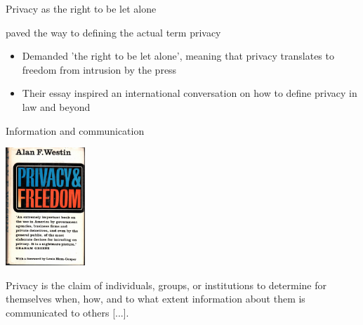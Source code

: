 \documentclass[12pt,aspectratio=169,handout]{beamer}
\begin{document}
\begin{frame}{Privacy as the right to be let alone}


\citet{Warren.Brandeis.1890} paved the way to defining the actual term privacy

\begin{itemize}
\item Demanded 'the right to be let alone', meaning that privacy translates to freedom
from intrusion by the press
\item  Their essay inspired an international conversation on how to define privacy in law and beyond
\end{itemize}



	
\end{frame}



\begin{frame}{Information and communication}

\includegraphics[width=3cm]{img/westin.jpg}

Privacy is the claim of individuals, groups, or institutions to determine for themselves
when, how, and to what extent information about them is communicated to others [...]. \citep[p.~5]{Westin.1967}




\end{frame}
\end{document}
